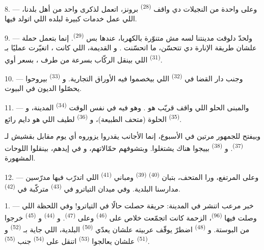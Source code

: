 8. --- وعلى واحدة من النجيلات دي واقف  \textsuperscript{(28)} برونز،
اتعمل لذكرى واحد من أهل بلدنا، اللي عمل خدمات كبيرة لبلده اللي اتولد فيها.

\VUsaut{4.0mm}
\VUsaut{3.4mm}

9. --- ولحدّ دلوقت مدينتنا لسه مش متنوّرة بالكهربا، عندها بس 
\textsuperscript{(29)}. إنما  بتعمل حملة علشان طريقة
الإنارة دي تتحسّن،  ما اتحسّنت .
و القديمة، اللي كانت  ، اتغيّرت
عمليًا بـ \textsuperscript{(31)} اللي بينقل الركّاب بسرعة من طرف
، بسعر  أوي.

10. --- وجنب دار القضا في  \textsuperscript{(32)} اللي بيخصموا فيه
الأوراق التجارية. و \textsuperscript{(33)} بيروحوا يحصّلوا
الديون في البيوت.

\VUsaut{4.0mm}
\VUsaut{3.4mm}

11. --- والمبنى الحلو اللي واقف قريّب هو . وهو فيه في نفس الوقت
 \textsuperscript{(34)} المدينة، و
\textsuperscript{(35)} الحلوة (متحف الطبيعة)، و \textsuperscript{(36)}
لطيف اللي هو  دايم رائع.

وبيفتح للجمهور مرتين في الأسبوع، إنما الأجانب يقدروا يزوروه أي يوم مقابل بقشيش
لـ \textsuperscript{(37)}. و \textsuperscript{(38)}
بييجوا هناك يشتغلوا. وبتشوفهم  حمّالاتهم، و في
إيدهم، بينقلوا اللوحات المشهورة.

12. --- وعلى المرتفع، ورا المتحف، بتبان  \textsuperscript{(40)}
 \textsuperscript{(39)} ومباني 
\textsuperscript{(41)} اللي اتدرّب فيها مدرّسين مدارسنا البلدية. وفي ميدان التياترو
في  \textsuperscript{(43)} متركّبة في 
\textsuperscript{(42)}.

\VUsaut{5.0mm}
\VUsaut{3.0mm}

\VUsaut{3.4mm}

1. --- خبر مرعب اتنشر في المدينة: حريقة حصلت حالًا في التياترو! وفي اللحظة اللي
وصلت فيها  \textsuperscript{(96)}، الزحمة كانت اتجمّعت خلاص على
 \textsuperscript{(46)} وعلى  \textsuperscript{(47)}.
و \textsuperscript{(44)} و \textsuperscript{(45)}
خرجوا من البوستة. و \textsuperscript{(48)} اضطرّ يوقّف عربيته
علشان يعدّي  \textsuperscript{(50)} البلدية، اللي جاية
بـ \textsuperscript{(52)} و \textsuperscript{(51)} علشان
يعالجوا  \textsuperscript{(53)} اتنقل على 
\textsuperscript{(54)} جنب  \textsuperscript{(55)}.

